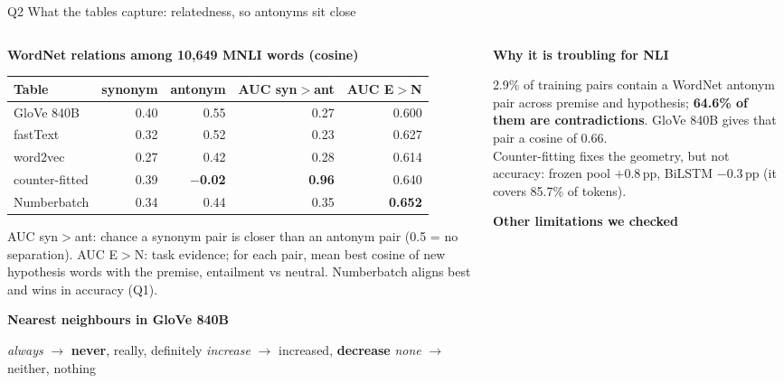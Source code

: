 \documentclass[10pt,aspectratio=169]{beamer}
\newcommand{\hd}[1]{{\footnotesize\bfseries\color{accent}#1}\par\vspace{2pt}}
\newcommand{\best}[1]{\cellcolor{soft}\textbf{#1}}
\newcommand{\pp}{\,pp\xspace}
\begin{document}
\begin{frame}[t]{Q2 What the tables capture: relatedness, so antonyms sit close}
\vspace{-4pt}
\begin{columns}[T,onlytextwidth]
\begin{column}{.52\textwidth}
\hd{WordNet relations among 10,649 MNLI words (cosine)}
{\scriptsize\centering
\begin{tabular}{@{}lrrrr@{}}\toprule
Table & synonym & antonym & AUC syn$>$ant & AUC E$>$N\\\midrule
GloVe 840B & 0.40 & 0.55 & 0.27 & 0.600\\
fastText & 0.32 & 0.52 & 0.23 & 0.627\\
word2vec & 0.27 & 0.42 & 0.28 & 0.614\\
counter-fitted & 0.39 & \best{$-$0.02} & \best{0.96} & 0.640\\
Numberbatch & 0.34 & 0.44 & 0.35 & \best{0.652}\\\bottomrule
\end{tabular}\par}
\vspace{2pt}
{\scriptsize AUC syn$>$ant: chance a synonym pair is closer than an antonym pair (0.5 = no separation).
AUC E$>$N: task evidence; for each pair, mean best cosine of new hypothesis words with the premise,
entailment vs neutral. Numberbatch aligns best and wins in accuracy (Q1).\par}
\vspace{6pt}
\hd{Nearest neighbours in GloVe 840B}
{\scriptsize \emph{always} $\to$ \textbf{never}, really, definitely \quad
\emph{increase} $\to$ increased, \textbf{decrease} \quad
\emph{none} $\to$ neither, nothing\par}
\end{column}
\begin{column}{.45\textwidth}
\hd{Why it is troubling for NLI}
{\scriptsize
2.9\% of training pairs contain a WordNet antonym pair across premise and hypothesis;
\textbf{64.6\% of them are contradictions}. GloVe 840B gives that pair a cosine of 0.66.\\[3pt]
Counter-fitting fixes the geometry, but not accuracy: frozen pool $+0.8$\pp, BiLSTM $-0.3$\pp
(it covers 85.7\% of tokens).\par}
\vspace{6pt}
\hd{Other limitations we checked}
{\scriptsize
\begin{itemize}\setlength{\itemsep}{1pt}

\end{itemize}}
\end{column}
\end{columns}
\end{frame}
\end{document}
